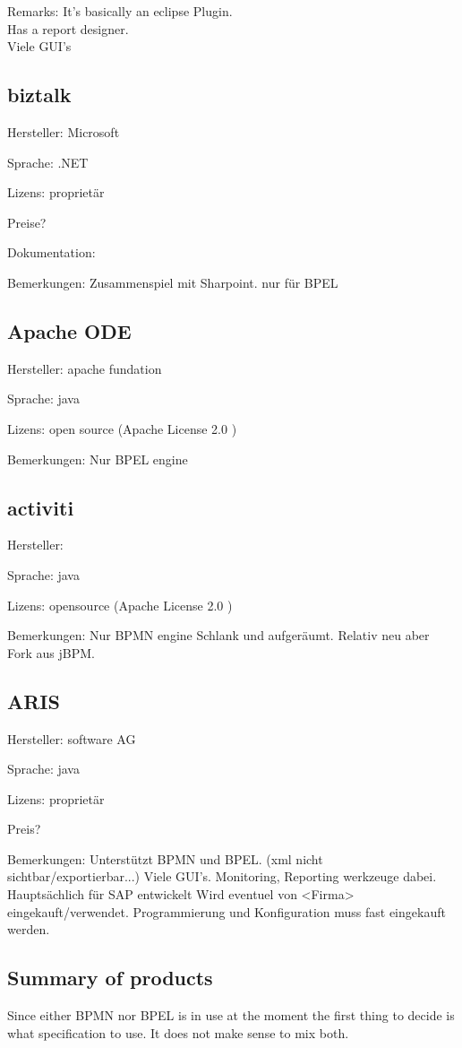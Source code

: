 \documentclass[paper=a4,twoside=false,BCOR=0mm,DIV=calc,fontsize=12pt]{scrartcl}
\begin{document}
Remarks: It's basically an eclipse Plugin. \\
Has a report designer. \\
Viele GUI's


\subsection{biztalk}
Hersteller: Microsoft

Sprache: .NET

Lizens: proprietär


Preise?

Dokumentation:

Bemerkungen:
Zusammenspiel mit Sharpoint.
nur für BPEL



\subsection{Apache ODE}
Hersteller: apache fundation

Sprache: java

Lizens: open source (Apache License 2.0 )

Bemerkungen:
Nur BPEL engine



\subsection{activiti}
Hersteller:

Sprache: java

Lizens: opensource (Apache License 2.0 )


Bemerkungen:
Nur BPMN engine
Schlank und aufgeräumt. 
Relativ neu aber Fork aus jBPM.


\subsection{ARIS}
Hersteller: software AG

Sprache: java

Lizens: proprietär

Preis?

Bemerkungen:
Unterstützt BPMN und BPEL. (xml nicht sichtbar/exportierbar...)
Viele GUI's. 
Monitoring, Reporting werkzeuge dabei.
Hauptsächlich für SAP entwickelt
Wird eventuel von <Firma> eingekauft/verwendet.
Programmierung und Konfiguration muss fast eingekauft werden.



\subsection{Summary of products}
Since either BPMN nor BPEL is in use at the moment the first thing to decide is what specification to use.
It does not make sense to mix both. 
\end{document}

